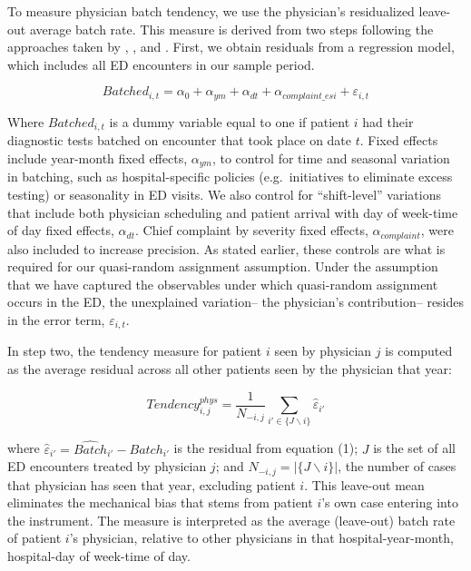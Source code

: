 \documentclass[,,nonblindrev]{informs}
\begin{document}
To measure physician batch tendency, we use the physician's residualized
leave-out average batch rate. This measure is derived from two steps
following the approaches taken by \citet{doyle2015measuring},
\citet{dobbie2018effects}, and \citet{eichmeyer2022pathways}. First, we
obtain residuals from a regression model, which includes all ED
encounters in our sample period.

\begin{equation}
Batched_{i,t} = \alpha_0 + \alpha_{ym} + \alpha_{dt} + \alpha_{complaint\_esi} + \varepsilon_{i,t}
\end{equation}

Where \(Batched_{i,t}\) is a dummy variable equal to one if patient
\(i\) had their diagnostic tests batched on encounter that took place on
date \(t\). Fixed effects include year-month fixed effects,
\(\alpha_{ym}\), to control for time and seasonal variation in batching,
such as hospital-specific policies (e.g.~initiatives to eliminate excess
testing) or seasonality in ED visits. We also control for
``shift-level'' variations that include both physician scheduling and
patient arrival with day of week-time of day fixed effects,
\(\alpha_{dt}\). Chief complaint by severity fixed effects,
\(\alpha_{complaint}\), were also included to increase precision. As
stated earlier, these controls are what is required for our quasi-random
assignment assumption. Under the assumption that we have captured the
observables under which quasi-random assignment occurs in the ED, the
unexplained variation-- the physician's contribution-- resides in the
error term, \(\varepsilon_{i,t}\).

In step two, the tendency measure for patient \(i\) seen by physician
\(j\) is computed as the average residual across all other patients seen
by the physician that year:

\begin{equation}
Tendency_{i,j}^{phys} =
\frac{1}{N_{-i,j}} \sum_{i' \in \{J \backslash i\}}\hat{\varepsilon}_{i'}
\end{equation}

where \(\hat{\varepsilon}_{i'} = \hat{Batch}_{i'} - Batch_{i'}\) is the
residual from equation (1); \(J\) is the set of all ED encounters
treated by physician \(j\); and \(N_{-i,j} = |\{J \backslash i\}|\), the
number of cases that physician has seen that year, excluding patient
\(i\). This leave-out mean eliminates the mechanical bias that stems
from patient \(i\)'s own case entering into the instrument. The measure
is interpreted as the average (leave-out) batch rate of patient \(i\)'s
physician, relative to other physicians in that hospital-year-month,
hospital-day of week-time of day.
\end{document}
